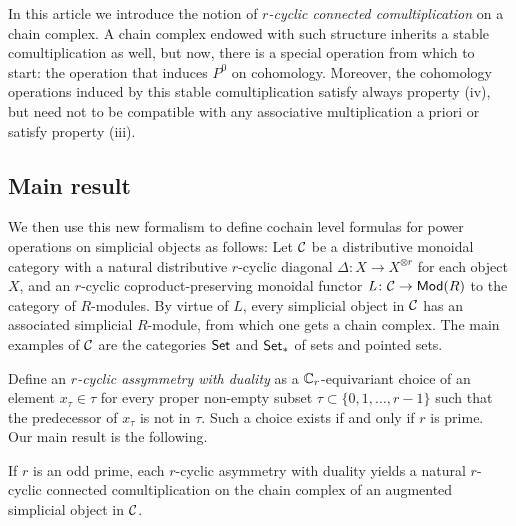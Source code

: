 In this article we introduce the notion of \emph{$r$-cyclic connected comultiplication} on a chain complex. A chain complex endowed with such structure inherits a stable comultiplication as well, but now, there is a special operation from which to start: the operation that induces $P^0$ on cohomology. Moreover, the cohomology operations induced by this stable comultiplication satisfy always property (iv), but need not to be compatible with any associative multiplication a priori or satisfy property (iii). %



\subsection{Main result} We then use this new formalism to define cochain level formulas for power operations on simplicial objects as follows: Let $\mathcal{C}$ be a distributive monoidal category with a natural distributive $r$-cyclic diagonal $\Delta\colon X\to X^{\otimes r}$ for each object $X$, and an $r$-cyclic coproduct-preserving monoidal functor $\operatorname{{\it L}}\colon \mathcal{C}\to \mathsf{Mod}(R)$ to the category of $R$-modules. By virtue of $L$, every simplicial object in $\mathcal{C}$ has an associated simplicial $R$-module, from which one gets a chain complex. The main examples of $\mathcal{C}$ are the categories $\mathsf{Set}$ and $\mathsf{Set}_*$ of sets and pointed sets.

Define an \emph{$r$-cyclic assymmetry with duality} as a $\mathbb{C}_r$-equivariant choice of an element $x_\tau\in \tau$ for every proper non-empty subset $\tau\subset \{0,1,\ldots,r-1\}$ such that the predecessor of $x_\tau$ is not in $\tau$. Such a choice exists if and only if $r$ is prime. Our main result is the following.

\begin{theorem}\label{thm:main}
	If $r$ is an odd prime, each $r$-cyclic asymmetry with duality yields a natural $r$-cyclic connected comultiplication on the chain complex of an augmented simplicial object in $\mathcal{C}$.
\end{theorem}

